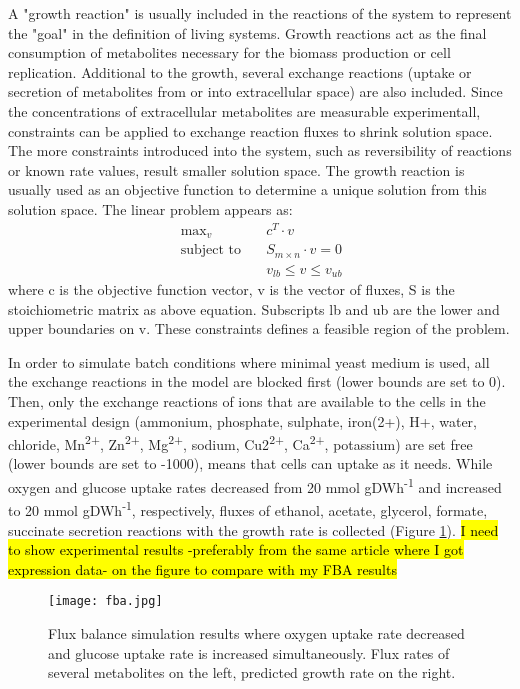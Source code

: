 A "growth reaction" is usually included in the reactions of the system to represent the "goal" in the definition of living systems. Growth reactions act as the final consumption of metabolites necessary for the biomass production or cell replication. Additional to the growth, several exchange reactions (uptake or secretion of metabolites from or into extracellular space) are also included. Since the concentrations of extracellular metabolites are measurable experimentall, constraints can be applied to exchange reaction fluxes to shrink solution space. The more constraints introduced into the system, such as reversibility of reactions or known rate values, result smaller solution space. The growth reaction is usually used as an objective function to determine a unique solution from this solution space. The linear problem appears as:
\begin{align}
 \ \text{max}_v \quad & c^T \cdot v \\
 \label{eq:fba}
 \ \text{subject to} \quad & S_{m \times n} \cdot v=0 \\
 \ & v_{lb} \leq v \leq v_{ub}
\end{align}
\noindent where c is the objective function vector, v is the vector of fluxes, S is the stoichiometric matrix as above equation. Subscripts lb and ub are the lower and upper boundaries on v. These constraints defines a feasible region of the problem.

In order to simulate batch conditions where minimal yeast medium is used, all the exchange reactions in the model are blocked first (lower bounds are set to 0). Then, only the exchange reactions of ions that are available to the cells in the experimental design (ammonium, phosphate, sulphate, iron(2+), H+, water, chloride, Mn\textsuperscript{2+}, Zn\textsuperscript{2+}, Mg\textsuperscript{2+}, sodium, Cu2\textsuperscript{2+}, Ca\textsuperscript{2+}, potassium) are set free (lower bounds are set to -1000), means that cells can uptake as it needs. While oxygen and glucose uptake rates decreased from 20 mmol gDWh\textsuperscript{-1} and increased to 20 mmol gDWh\textsuperscript{-1}, respectively, fluxes of ethanol, acetate, glycerol, formate, succinate secretion reactions with the growth rate is collected (Figure \ref{fig:fba}).
\hl{I need to show experimental results -preferably from the same article where I got expression data- on the figure to compare with my FBA results}

\begin{figure}[H]
\begin{center}
\texttt{[image: fba.jpg]}
\end{center}
\caption[Flux balance simulation results]{Flux balance simulation results where oxygen uptake rate decreased and glucose uptake rate is increased simultaneously. Flux rates of several metabolites on the left, predicted growth rate on the right.}
\label{fig:fba}
\end{figure}

